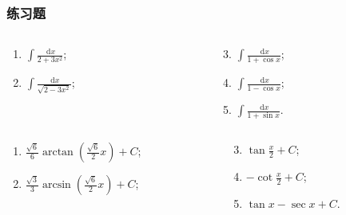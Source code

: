 \documentclass[
10pt,
aspectratio=43,
]{beamer}
\begin{document}
\begin{frame}
	\frametitle{练习题}
	\everymath{\displaystyle}
	\begin{block}{}
		\begin{columns}[onlytextwidth]
			\begin{column}{0.5\textwidth}
				\begin{enumerate}
					\item $\int \frac{\mathrm{~d} x}{2+3 x^2}$;
					\item $\int \frac{\mathrm{~d} x}{\sqrt{2-3 x^2}}$;
				\end{enumerate}
			\end{column}
			\begin{column}{0.5\textwidth}
				\begin{enumerate}
					\setcounter{enumi}{2}
					\item $\int \frac{\mathrm{~d} x}{1+\cos x}$;
					\item $\int \frac{\mathrm{~d} x}{1-\cos x}$;
					\item $\int \frac{\mathrm{~d} x}{1+\sin x}$.
				\end{enumerate}
			\end{column}
		\end{columns}
	\end{block}
	\begin{exampleblock}{}
		\begin{columns}[onlytextwidth]
			\begin{column}{0.5\textwidth}
				\begin{enumerate}
					\pause \item $\frac{\sqrt{6}}{6}\arctan\left(\frac{\sqrt{6}}{2}x\right)+C$;
					      \pause \item $\frac{\sqrt{3}}{3} \arcsin \left(\frac{\sqrt{6}}{2} x\right)+C$;
				\end{enumerate}
			\end{column}
			\begin{column}{0.5\textwidth}
				\begin{enumerate}
					\setcounter{enumi}{2}
					\pause
					\item $\tan\frac{x}{2}+C$;
					      \pause
					\item $-\cot\frac{x}{2}+C$;
					      \pause
					\item $\tan x-\sec x +C$.
				\end{enumerate}
			\end{column}
		\end{columns}
	\end{exampleblock}
\end{frame}
\end{document}
